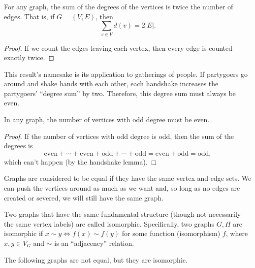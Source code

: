 \documentclass[../m55main.tex]{subfiles}
\begin{document}
\begin{lemma}
    For any graph, the sum of the degrees of the vertices is twice the number of edges.
    That is, if $G = (V,E)$, then
    \[ \sum_{v \in V} d(v) = 2 |E|. \]
\end{lemma}

\begin{proof}
    If we count the edges leaving each vertex, then every edge is counted exactly twice. 
\end{proof}

This result's namesake is its application to gatherings of people.
If partygoers go around and shake hands with each other, each handshake increases the partygoers' ``degree sum'' by two.
Therefore, this degree sum must always be even.

\begin{corollary}[Oddballs]
    In any graph, the number of vertices with odd degree must be even.
\end{corollary}

\begin{proof}
    If the number of vertices with odd degree is odd, then the sum of the degrees is
    \[ \text{even} + \cdots + \text{even} + \text{odd} + \cdots + \text{odd} = \text{even} + \text{odd} = \text{odd}, \]
    which can't happen (by the handshake lemma).
\end{proof}

Graphs are considered to be equal if they have the same vertex and edge sets.
We can push the vertices around as much as we want and, so long as no edges are created or severed, we will still have the same graph.

Two graphs that have the same fundamental structure (though not necessarily the same vertex labels) are called isomorphic.
Specifically, two graphs $G,H$ are isomorphic if $x \sim y \iff f(x) \sim f(y)$ for some function (isomorphism) $f$, where $x,y \in V_G$ and $\sim$ is an ``adjacency'' relation.

The following graphs are not equal, but they are isomorphic.

\medskip
\begin{center}
\end{center}
\end{document}
